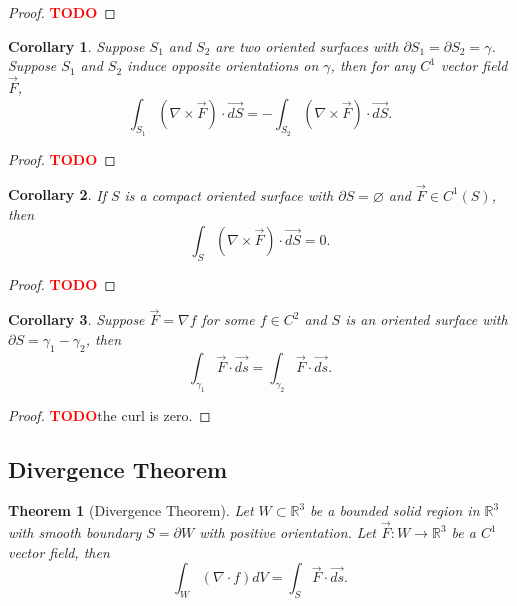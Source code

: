 \documentclass{article}
\theoremstyle{plain}
\newtheorem{theorem}{Theorem}[subsection]
\newtheorem*{corollary}{Corollary}
\theoremstyle{definition}
\newcommand{\R}{\mathbb{R}}
\newcommand{\td}{\textcolor{red}{\textbf{TODO}}}
\begin{document}
\begin{proof}
    \td 
\end{proof}

\begin{corollary}
    Suppose $S_1$ and $S_2$ are two oriented surfaces with $\partial S_1 = \partial S_2 = \gamma$. Suppose $S_1$ and $S_2$ induce opposite orientations on $\gamma$, then for any $C^1$ vector field $\vec{F}$,
    $$\int_{S_1}(\nabla \times \vec{F})\cdot \vec{dS} = - \int_{S_2}(\nabla \times \vec{F})\cdot \vec{dS}.$$
\end{corollary}

\begin{proof}
    \td
\end{proof}

\begin{corollary}
    If $S$ is a compact oriented surface with $\partial S = \varnothing$ and $\vec{F} \in C^1(S)$, then
    $$\int_S (\nabla \times \vec{F}) \cdot \vec{dS} = 0.$$
\end{corollary}

\begin{proof}
    \td
\end{proof}

\begin{corollary}
    Suppose $\vec{F} = \nabla f$ for some $f \in C^2$ and $S$ is an oriented surface with $\partial S = \gamma_1 - \gamma_2$, then
    $$\int_{\gamma_1}\vec{F} \cdot \vec{ds} = \int_{\gamma_2}\vec{F} \cdot \vec{ds}.$$
\end{corollary}

\begin{proof}
    \td the curl is zero.
\end{proof}

\subsection{Divergence Theorem}

\begin{theorem}[Divergence Theorem]
    Let $W \subset \R^3$ be a bounded solid region in $\R^3$ with smooth boundary $S = \partial W$ with positive orientation. Let $\vec{F} : W \to \R^3$ be a $C^1$ vector field, then
    $$\int_W(\nabla \cdot f)dV = \int_S \vec{F} \cdot \vec{ds}.$$
\end{theorem}
\end{document}
